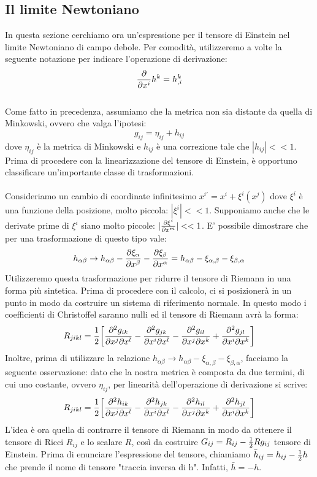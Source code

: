 \documentclass[]{report}
\theoremstyle{definition}
\theoremstyle{Theorem}
\theoremstyle{definition}
\theoremstyle{definition}
\theoremstyle{definition}
\begin{document}
\subsection{Il limite Newtoniano}
In questa sezione cerchiamo ora un'espressione per il tensore di Einstein nel limite Newtoniano di campo debole. Per comodità, utilizzeremo a volte la seguente notazione per indicare l'operazione di derivazione:
$${\partial\over\partial x^i}h^{k}=h^k_{,i}$$
\\
Come fatto in precedenza, assumiamo che la metrica non sia distante da quella di Minkowski, ovvero che valga l'ipotesi:
$$g_{ij}=\eta_{ij}+h_{ij}$$
dove $\eta_{ij}$ è la metrica di Minkowski e $h_{ij}$ è una correzione tale che $|h_{ij}|<<1$. Prima di procedere con la linearizzazione del tensore di Einstein, è opportuno classificare un'importante classe di trasformazioni.\\
\\
Consideriamo un cambio di coordinate infinitesimo $x^{i'}=x^i+\xi^i(x^j)$ dove $\xi^i$ è una funzione della posizione, molto piccola: $|\xi^i|<<1$. Supponiamo anche che le derivate prime di $\xi^i$ siano molto piccole: $|{\partial\xi^i\over \partial x^m}|<<1$. E' possibile dimostrare che per una trasformazione di questo tipo vale:
$$h_{\alpha\beta}\rightarrow h_{\alpha\beta}-{\partial\xi_{\alpha}\over \partial x^\beta}-{\partial\xi_{\beta}\over \partial x^\alpha}=
h_{\alpha\beta}-\xi_{\alpha,\beta}-\xi_{\beta,\alpha}$$ 
Utilizzeremo questa trasformazione per ridurre il tensore di Riemann in una forma più sintetica. Prima di procedere con il calcolo, ci si posizionerà in un punto in modo da costruire un sistema di riferimento normale. In questo modo i coefficienti di Christoffel saranno nulli ed il tensore di Riemann avrà la forma:
$$R_{jikl}={1\over 2}\bigg{[}{\partial^2 g_{ik} \over\partial x^j\partial x^l}-{\partial^2 g_{jk}\over\partial x^i\partial x^l}-{\partial^2 g_{il} \over\partial x^j\partial x^k}+{\partial^2 g_{jl}\over\partial x^i\partial x^k}\bigg{]}$$
Inoltre, prima di utilizzare la relazione $h_{\alpha\beta}\rightarrow h_{\alpha\beta}-\xi_{\alpha,\beta}-\xi_{\beta,\alpha}$, facciamo la seguente osservazione: dato che la nostra metrica è composta da due termini, di cui uno costante, ovvero $\eta_{ij}$, per linearità dell'operazione di derivazione si scrive:
$$R_{jikl}={1\over 2}\bigg{[}{\partial^2 h_{ik} \over\partial x^j\partial x^l}-{\partial^2 h_{jk}\over\partial x^i\partial x^l}-{\partial^2 h_{il} \over\partial x^j\partial x^k}+{\partial^2 h_{jl}\over\partial x^i\partial x^k}\bigg{]}$$
L'idea è ora quella di contrarre il tensore di Riemann in modo da ottenere il tensore di Ricci $R_{ij}$ e lo scalare $R$, così da costruire $G_{ij}=R_{ij}-{1\over2}Rg_{ij}$ tensore di Einstein. Prima di enunciare l'espressione del tensore, chiamiamo $\bar{h}_{ij}=h_{ij}-{1\over 2}h$ che prende il nome di tensore "traccia inversa di h". Infatti, $\bar{h}=-h$.
\end{document}
